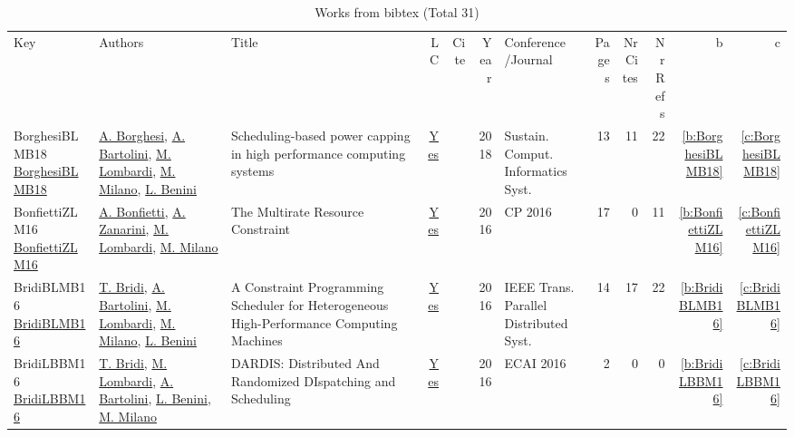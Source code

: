 {\scriptsize
\begin{longtable}{>{\raggedright\arraybackslash}p{3cm}>{\raggedright\arraybackslash}p{6cm}>{\raggedright\arraybackslash}p{6.5cm}rrrp{2.5cm}rrrrr}
\rowcolor{white}\caption{Works from bibtex (Total 31)}\\ \toprule
\rowcolor{white}Key & Authors & Title & LC & Cite & Year & \shortstack{Conference\\/Journal} & Pages & \shortstack{Nr\\Cites} & \shortstack{Nr\\Refs} & b & c \\ \midrule\endhead
\bottomrule
\endfoot
BorghesiBLMB18 \href{https://doi.org/10.1016/j.suscom.2018.05.007}{BorghesiBLMB18} & \hyperref[auth:a232]{A. Borghesi}, \hyperref[auth:a231]{A. Bartolini}, \hyperref[auth:a143]{M. Lombardi}, \hyperref[auth:a144]{M. Milano}, \hyperref[auth:a248]{L. Benini} & Scheduling-based power capping in high performance computing systems & \href{works/BorghesiBLMB18.pdf}{Yes} & \cite{BorghesiBLMB18} & 2018 & Sustain. Comput. Informatics Syst. & 13 & 11 & 22 & \ref{b:BorghesiBLMB18} & \ref{c:BorghesiBLMB18}\\
BonfiettiZLM16 \href{https://doi.org/10.1007/978-3-319-44953-1\_8}{BonfiettiZLM16} & \hyperref[auth:a204]{A. Bonfietti}, \hyperref[auth:a205]{A. Zanarini}, \hyperref[auth:a143]{M. Lombardi}, \hyperref[auth:a144]{M. Milano} & The Multirate Resource Constraint & \href{works/BonfiettiZLM16.pdf}{Yes} & \cite{BonfiettiZLM16} & 2016 & CP 2016 & 17 & 0 & 11 & \ref{b:BonfiettiZLM16} & \ref{c:BonfiettiZLM16}\\
BridiBLMB16 \href{https://doi.org/10.1109/TPDS.2016.2516997}{BridiBLMB16} & \hyperref[auth:a233]{T. Bridi}, \hyperref[auth:a231]{A. Bartolini}, \hyperref[auth:a143]{M. Lombardi}, \hyperref[auth:a144]{M. Milano}, \hyperref[auth:a248]{L. Benini} & A Constraint Programming Scheduler for Heterogeneous High-Performance Computing Machines & \href{works/BridiBLMB16.pdf}{Yes} & \cite{BridiBLMB16} & 2016 & {IEEE} Trans. Parallel Distributed Syst. & 14 & 17 & 22 & \ref{b:BridiBLMB16} & \ref{c:BridiBLMB16}\\
BridiLBBM16 \href{https://doi.org/10.3233/978-1-61499-672-9-1598}{BridiLBBM16} & \hyperref[auth:a233]{T. Bridi}, \hyperref[auth:a143]{M. Lombardi}, \hyperref[auth:a231]{A. Bartolini}, \hyperref[auth:a248]{L. Benini}, \hyperref[auth:a144]{M. Milano} & {DARDIS:} Distributed And Randomized DIspatching and Scheduling & \href{works/BridiLBBM16.pdf}{Yes} & \cite{BridiLBBM16} & 2016 & ECAI 2016 & 2 & 0 & 0 & \ref{b:BridiLBBM16} & \ref{c:BridiLBBM16}\\

\end{longtable}}
